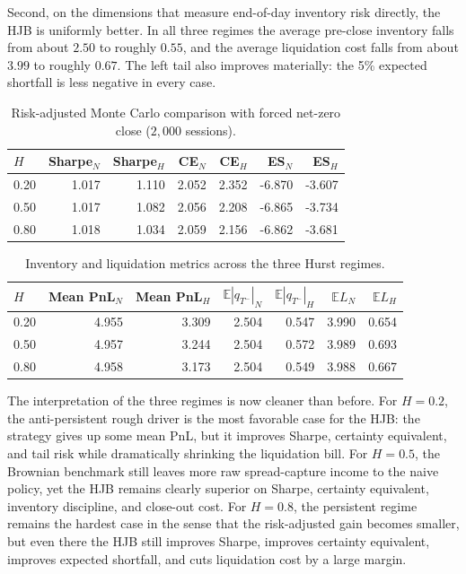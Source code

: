 \documentclass[a4paper,10pt,titlepage,oneside,openany]{book}
\theoremstyle{plain}
\theoremstyle{definition}
\theoremstyle{remark}
\newcommand{\E}{\mathbb{E}}
\newcommand{\1}{\mathbf{1}}
\begin{document}
Second, on the dimensions that measure end-of-day inventory risk directly, the HJB is uniformly better. In all three regimes the average pre-close inventory falls from about \(2.50\) to roughly \(0.55\), and the average liquidation cost falls from about \(3.99\) to roughly \(0.67\). The left tail also improves materially: the 5\% expected shortfall is less negative in every case.

\begin{table}[H]
\centering
\caption{Risk-adjusted Monte Carlo comparison with forced net-zero close (\(2{,}000\) sessions).}
\label{tab:hjb_mc_risk}
\begin{tabular}{@{}lrrrrrr@{}}
\toprule
\(H\) & Sharpe\(_N\) & Sharpe\(_H\) & CE\(_N\) & CE\(_H\) & ES\(_N\) & ES\(_H\) \\
\midrule
0.20 & 1.017 & 1.110 & 2.052 & 2.352 & -6.870 & -3.607 \\
0.50 & 1.017 & 1.082 & 2.056 & 2.208 & -6.865 & -3.734 \\
0.80 & 1.018 & 1.034 & 2.059 & 2.156 & -6.862 & -3.681 \\
\bottomrule
\end{tabular}
\end{table}

\begin{table}[H]
\centering
\caption{Inventory and liquidation metrics across the three Hurst regimes.}
\label{tab:hjb_mc_inventory}
\begin{tabular}{@{}lrrrrrr@{}}
\toprule
\(H\) & Mean PnL\(_N\) & Mean PnL\(_H\) & \(\E|q_{T^-}|_N\) & \(\E|q_{T^-}|_H\) & \(\E L_N\) & \(\E L_H\) \\
\midrule
0.20 & 4.955 & 3.309 & 2.504 & 0.547 & 3.990 & 0.654 \\
0.50 & 4.957 & 3.244 & 2.504 & 0.572 & 3.989 & 0.693 \\
0.80 & 4.958 & 3.173 & 2.504 & 0.549 & 3.988 & 0.667 \\
\bottomrule
\end{tabular}
\end{table}

The interpretation of the three regimes is now cleaner than before. For \(H=0.2\), the anti-persistent rough driver is the most favorable case for the HJB: the strategy gives up some mean PnL, but it improves Sharpe, certainty equivalent, and tail risk while dramatically shrinking the liquidation bill. For \(H=0.5\), the Brownian benchmark still leaves more raw spread-capture income to the naive policy, yet the HJB remains clearly superior on Sharpe, certainty equivalent, inventory discipline, and close-out cost. For \(H=0.8\), the persistent regime remains the hardest case in the sense that the risk-adjusted gain becomes smaller, but even there the HJB still improves Sharpe, improves certainty equivalent, improves expected shortfall, and cuts liquidation cost by a large margin.
\end{document}
